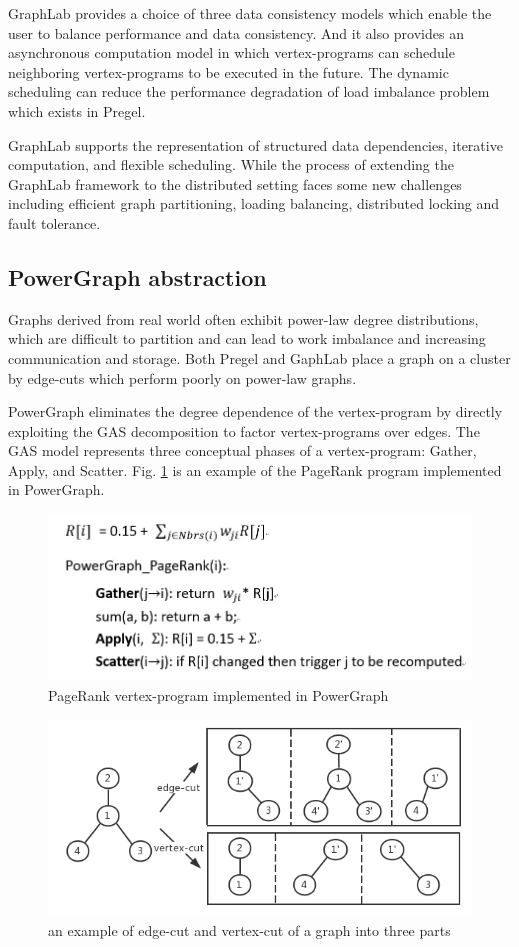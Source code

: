 \documentclass[journal]{IEEEtran}
\begin{document}
GraphLab provides a choice of three data consistency models which enable the user to balance performance and data consistency. And it also provides an asynchronous computation model in which vertex-programs can schedule neighboring vertex-programs to be executed in the future. The dynamic scheduling can reduce the performance degradation of load imbalance problem which exists in Pregel\cite{Pregel}.

GraphLab supports the representation of structured data dependencies, iterative computation, and flexible scheduling. While the process of extending the GraphLab framework to the distributed setting faces some new challenges including efficient graph partitioning, loading balancing, distributed locking and fault tolerance\cite{GraphLab}. 
\subsection{PowerGraph abstraction}
Graphs derived from real world often exhibit power-law degree distributions, which are difficult to partition and can lead to work imbalance and increasing communication and storage. Both Pregel and GaphLab place a graph on a cluster by edge-cuts which perform poorly on power-law graphs.

PowerGraph eliminates the degree dependence of the vertex-program by directly exploiting the GAS decomposition to factor vertex-programs over edges\cite{PowerGraph}. The GAS model represents three conceptual phases of a vertex-program: Gather, Apply, and Scatter. Fig. \ref{powergraph1} is an example of the PageRank program implemented in PowerGraph\cite{PageRank}.
\begin{figure}
	\includegraphics[width=\linewidth]{powergraph1.jpg}
	\caption{PageRank vertex-program implemented in PowerGraph}
	\label{powergraph1}
\end{figure}
\begin{figure}
	\includegraphics[width=\linewidth]{powergraph2.jpg}
	\caption{an example of edge-cut and vertex-cut of a graph into three parts}
	\label{powergraph2}
\end{figure}
\end{document}
